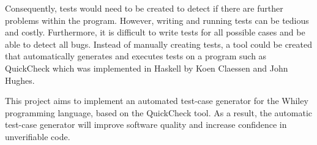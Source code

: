 Consequently, tests would need to be created to detect if there are further problems within the program. However, writing and running tests can be tedious and costly. Furthermore, it is difficult to write tests for all possible cases and be able to detect all bugs. Instead of manually creating tests, a tool could be created that automatically generates and executes tests on a program such as QuickCheck which was implemented in Haskell by Koen Claessen and John Hughes. \cite{QClightweight}


This project aims to implement an automated test-case generator for the Whiley programming language, based on the QuickCheck tool. As a result, the automatic test-case generator will improve software quality and increase confidence in unverifiable code. 


